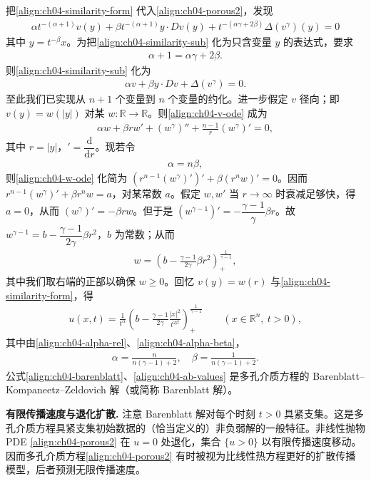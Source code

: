 \documentclass[../../main.tex]{subfiles}
\begin{document}
\begin{example}[一个伸缩不变解]
把\eqref{align:ch04-similarity-form} 代入\eqref{align:ch04-porous2}，发现
\begin{align}\label{align:ch04-similarity-sub}
\alpha t^{-(\alpha+1)}v(y)+\beta t^{-(\alpha+1)}y\cdot Dv(y)+t^{-(\alpha\gamma+2\beta)}\Delta(v^\gamma)(y)=0
\end{align}
其中 $y=t^{-\beta}x$。为把\eqref{align:ch04-similarity-sub} 化为只含变量 $y$ 的表达式，要求
\begin{align}\label{align:ch04-alpha-rel}
\alpha+1=\alpha\gamma+2\beta.
\end{align}
则\eqref{align:ch04-similarity-sub} 化为
\begin{align}\label{align:ch04-v-ode2}
\alpha v+\beta y\cdot Dv+\Delta(v^\gamma)=0.
\end{align}
至此我们已实现从 $n+1$ 个变量到 $n$ 个变量的约化。进一步假定 $v$ 径向；即 $v(y)=w(|y|)$ 对某 $w:\mathbb{R}\to\mathbb{R}$。则\eqref{align:ch04-v-ode} 成为
\begin{align}\label{align:ch04-w-ode}
\alpha w+\beta r w'+(w^\gamma)''+\frac{n-1}{r}(w^\gamma)'=0,
\end{align}
其中 $r=|y|$，$'=\dfrac{\mathrm{d}}{\mathrm{d}r}$。现若令
\begin{align}\label{align:ch04-alpha-beta}
\alpha=n\beta,
\end{align}
则\eqref{align:ch04-w-ode} 化简为 $(r^{n-1}(w^\gamma)')'+\beta(r^n w)'=0$。因而 $r^{n-1}(w^\gamma)'+\beta r^n w=a$，对某常数 $a$。假定 $w,w'$ 当 $r\to\infty$ 时衰减足够快，得 $a=0$，从而 $(w^\gamma)'=-\beta rw$。但于是 $(w^{\gamma-1})'=-\dfrac{\gamma-1}{\gamma}\beta r$。故 $w^{\gamma-1}=b-\dfrac{\gamma-1}{2\gamma}\beta r^2$，$b$ 为常数；从而
\begin{align}\label{align:ch04-w-radial}
w=\left(b-\frac{\gamma-1}{2\gamma}\beta r^2\right)_+^{\frac{1}{\gamma-1}},
\end{align}
其中我们取右端的正部以确保 $w\geqslant 0$。回忆 $v(y)=w(r)$ 与\eqref{align:ch04-similarity-form}，得
\begin{align}\label{align:ch04-barenblatt}
u(x,t)=\frac{1}{t^\alpha}\left(b-\frac{\gamma-1}{2\gamma}\frac{|x|^2}{t^{2\beta}}\right)_+^{\frac{1}{\gamma-1}} \qquad(x\in\mathbb{R}^n,\ t>0),
\end{align}
其中由\eqref{align:ch04-alpha-rel}、\eqref{align:ch04-alpha-beta}，
\begin{align}\label{align:ch04-ab-values}
\alpha=\frac{n}{n(\gamma-1)+2},\quad \beta=\frac{1}{n(\gamma-1)+2}.
\end{align}
公式\eqref{align:ch04-barenblatt}、\eqref{align:ch04-ab-values} 是多孔介质方程的 Barenblatt--Kompaneetz--Zeldovich 解（或简称 Barenblatt 解）。
\end{example}

\textbf{有限传播速度与退化扩散.} 注意 Barenblatt 解对每个时刻 $t>0$ 具紧支集。这是多孔介质方程具紧支集初始数据的（恰当定义的）非负弱解的一般特征。非线性抛物 PDE \eqref{align:ch04-porous2} 在 $u=0$ 处退化，集合 $\{u>0\}$ 以有限传播速度移动。因而多孔介质方程\eqref{align:ch04-porous2} 有时被视为比线性热方程更好的扩散传播模型，后者预测无限传播速度。
\end{document}
